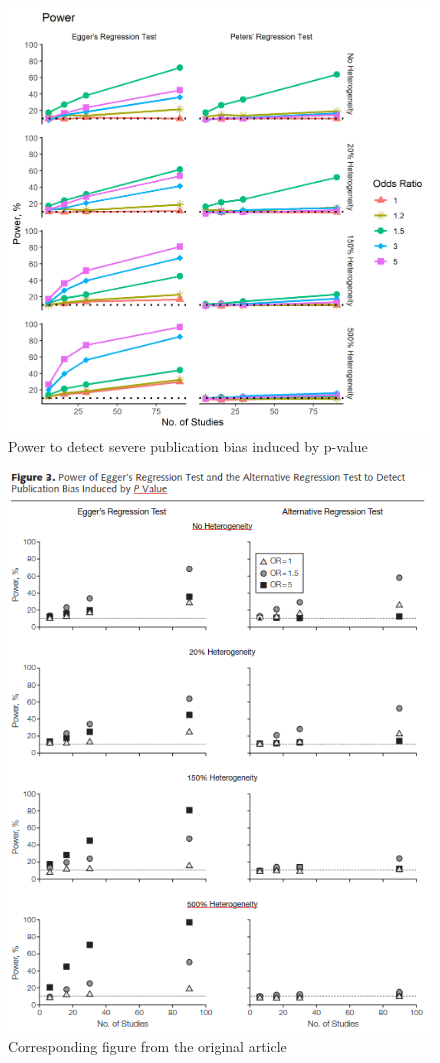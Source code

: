 \documentclass[
  english,
  doc,floatsintext,draftall]{apa6}
\begin{document}
\begin{figure}
\includegraphics[width=400pt]{../figures/power_p_severe} \caption{Power to detect severe publication bias induced by p-value}\label{fig:unnamed-chunk-7}
\end{figure}
\begin{figure}
\includegraphics[width=400pt]{../data/power} \caption{Corresponding figure from the original article}\label{fig:unnamed-chunk-8}
\end{figure}
\end{document}
